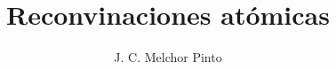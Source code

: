 \documentclass[12pt]{guia}
\title{Reconvinaciones atómicas}
\author{J. C. Melchor Pinto}
\begin{document}
\pagestyle{headandfoot}
\addpoints
\INFO
\printanswers
\begin{multicols}{2}
    
\end{multicols}



\end{document}
